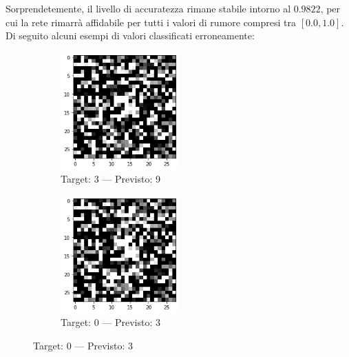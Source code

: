\documentclass[12pt, a4paper]{article}
\begin{document}
Sorprendetemente, il livello di accuratezza rimane stabile intorno al \(0.9822\), per cui la rete rimarrà affidabile per tutti i valori di rumore compresi tra \([0.0, 1.0]\).\\
Di seguito alcuni esempi di valori classificati erroneamente:
\begin{figure}[H]
    \begin{subfigure}{0.5\textwidth}
        \centering
        \caption{Target: 3 --- Previsto: 9}
        \includegraphics[width=0.5\textwidth]{ErrConv1.png}
    \end{subfigure}
    \begin{subfigure}{0.5\textwidth}
        \centering
        \caption{Target: 0 --- Previsto: 3}
        \includegraphics[width=0.5\textwidth]{ErrConv2.png}
    \end{subfigure}
\end{figure}
\end{document}
